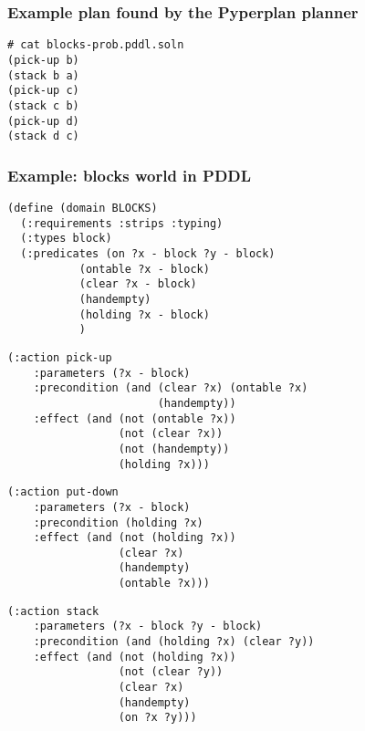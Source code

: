 \documentclass{gkibeamer}
\begin{document}
\begin{frame}[containsverbatim]
\frametitle{Example plan found by the Pyperplan planner}

\begin{verbatim}
# cat blocks-prob.pddl.soln
(pick-up b)
(stack b a)
(pick-up c)
(stack c b)
(pick-up d)
(stack d c)
\end{verbatim}

\end{frame}


\begin{frame}[containsverbatim]
\frametitle{Example: blocks world in PDDL}

\begin{verbatim}
(define (domain BLOCKS)
  (:requirements :strips :typing)
  (:types block)
  (:predicates (on ?x - block ?y - block)
	       (ontable ?x - block)
	       (clear ?x - block)
	       (handempty)
	       (holding ?x - block)
	       )
\end{verbatim}

\end{frame}

\begin{frame}[containsverbatim]

\begin{verbatim}
(:action pick-up
    :parameters (?x - block)
    :precondition (and (clear ?x) (ontable ?x)
                       (handempty))
    :effect (and (not (ontable ?x))
                 (not (clear ?x))
                 (not (handempty))
                 (holding ?x)))
\end{verbatim}
\end{frame}

\begin{frame}[containsverbatim]

\begin{verbatim}
(:action put-down
    :parameters (?x - block)
    :precondition (holding ?x)
    :effect (and (not (holding ?x))
                 (clear ?x)
                 (handempty)
                 (ontable ?x)))
\end{verbatim}

\end{frame}

\begin{frame}[containsverbatim]
\begin{verbatim}
(:action stack
    :parameters (?x - block ?y - block)
    :precondition (and (holding ?x) (clear ?y))
    :effect (and (not (holding ?x))
                 (not (clear ?y))
                 (clear ?x)
                 (handempty)
                 (on ?x ?y)))
\end{verbatim}
\end{frame}
\end{document}
